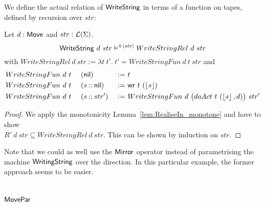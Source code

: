 We define the actual relation of $\mathsf{WriteString}$ in terms of a function on tapes, defined by recursion over $str$:
\begin{lemma}
  \label{lem:WriteString_Sem}
  Let $d:\mathsf{Move}$ and $str:\mathcal{L}(\Sigma)$.
  \[ \mathsf{WriteString}~d~str \mathrel{\vDash^{4\cdot\left| str \right|}} WriteStringRel~d~str \]
  with
  $WriteStringRel~d~str := \lambda t~t'.~t' = WriteStringFun~d~t~str$ and
  \begin{alignat*}{3}
    &WriteStringFun~d~t~&&(\mathsf{nil}        ) &~:=~& t \\
    &WriteStringFun~d~t~&&(s \mathbin{::} \mathsf{nil}) &~:=~& \mathsf{wr}~t~(\left\lfloor {s} \right\rfloor) \\
    &WriteStringFun~d~t~&&(s \mathbin{::} str') &~:=~& WriteStringFun~d~\bigl(doAct~t~(\left\lfloor {s} \right\rfloor, d)\bigr)~str'
  \end{alignat*}
\end{lemma}
\begin{proof}
  We apply the monotonicity Lemma~\ref{lem:RealiseIn_monotone} and have to show\\
  $R'~d~str \subseteq WriteStringRel~d~str$.  This can be shown by induction on $str$.
\end{proof}

Note that we could as well use the $\mathsf{Mirror}$ operator instead of parametrising the machine $\mathsf{WritingString}$ over the direction.  In this
particular example, the former approach seems to be easier.

\section{$\mathsf{MovePar}$}
\label{sec:MovePar}
%


